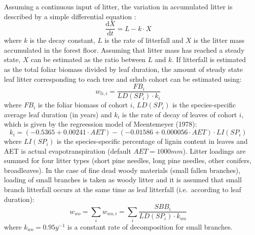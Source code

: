\documentclass[]{book}
\begin{document}
Assuming a continuous input of litter, the variation in accumulated litter is described by a simple differential equation \citep{Birk1980}:
\begin{equation}
\frac{\mathrm{d}X}{\mathrm{d}t} = L - k\cdot X
\end{equation}
where \(k\) is the decay constant, \(L\) is the rate of litterfall and \(X\) is the litter mass accumulated in the forest floor. Assuming that litter mass has reached a steady state, \(X\) can be estimated as the ratio between \(L\) and \(k\). If litterfall is estimated as the total foliar biomass divided by leaf duration, the amount of steady state leaf litter corresponding to each tree and srhub cohort can be estimated using:
\begin{equation}
w_{li, i} = \frac{FB_i}{LD(SP_i) \cdot k_i}
\end{equation}
where \(FB_i\) is the foliar biomass of cohort \(i\), \(LD(SP_i)\) is the species-specific average leaf duration (in years) and \(k_i\) is the rate of decay of leaves of cohort \(i\), which is given by the regreession model of Meentemeyer (1978):
\begin{equation}
k_i = (-0.5365+0.00241\cdot AET) - (-0.01586+0.000056\cdot AET) \cdot LI(SP_i) 
\end{equation}
where \(LI(SP_i)\) is the species-specific percentage of lignin content in leaves and AET is actual evapotranspiration (default \(AET = 1000 mm\)). Litter loadings are summed for four litter types (short pine needles, long pine needles, other conifers, broadleaves). In the case of fine dead woody materials (small fallen branches), loading of small branches is taken as woody litter and it is assumed that small branch litterfall occurs at the same time as leaf litterfall (i.e.~according to leaf duration):
\begin{equation}
w_{wo} = \sum_{i}{w_{wo, i}} = \sum_{i}{\frac{SBB_i}{LD(SP_i)\cdot k_{wo}} }
\end{equation}
where \(k_{wo} = 0.95 y^{-1}\) is a constant rate of decomposition for small branches.
\end{document}

